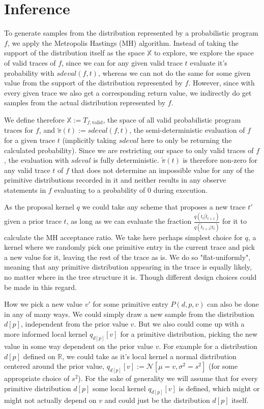 \section{Inference}

To generate samples from the distribution represented by a probabilistic program $f$, we apply the Metropolis Hastings (MH) algorithm. Instead of taking the support of the distribution itself as the space $\mathbb{X}$ to explore, we explore the space of valid traces of $f$, since we can for any given valid trace $t$ evaluate it's probability with $sdeval(f,t)$, whereas we can not do the same for some given value from the support of the distribution represented by $f$. However, since with every given trace we also get a corresponding return value, we indirectly do get samples from the actual distribution represented by $f$.

We define therefore $\mathbb{X} := T_{f,\text{valid}}$, the space of all valid probabilistic program traces for $f$, and $\tilde{\pi}(t) := sdeval(f,t)$, the semi-deterministic evaluation of $f$ for a given trace $t$ (implicitly taking $sdeval$ here to only be returning the calculated probability). Since we are restricting our space to only valid traces of $f$, the evaluation with $sdeval$ is fully deterministic. $\tilde{\pi}(t)$ is therefore non-zero for any valid trace $t$ of $f$ that does not determine an impossible value for any of the primitive distributions recorded in it and neither results in any observe statements in $f$ evaluating to a probability of $0$ during execution.

As the proposal kernel $q$ we could take any scheme that proposes a new trace $t'$ given a prior trace $t$, as long as we can evaluate the fraction $\frac{q(t_t | \hat{t}_{t+1})}{q(\hat{t}_{t+1} | t_t)}$ for it to calculate the MH acceptance ratio. We take here perhaps simplest choice for $q$, a kernel where we randomly pick one primitive entry in the current trace and pick a new value for it, leaving the rest of the trace as is. We do so "flat-uniformly", meaning that any primitive distribution appearing in the trace is equally likely, no matter where in the tree structure it is. Though different design choices could be made in this regard.

How we pick a new value $v'$ for some primitive entry $P(d,p,v)$ can also be done in any of many ways. We could simply draw a new sample from the distribution $d[p]$, independent from the prior value $v$. But we also could come up with a more informed local kernel $q_{d[p]}[v]$ for a primitive distribution, picking the new value in some way dependent on the prior value $v$. For example for a distribution $d[p]$ defined on $\mathbb{R}$, we could take as it's local kernel a normal distribution centered around the prior value, $q_{d[p]}[v] := \mathcal{N}[\mu = v, \sigma^2 = s^2]$ (for some appropriate choice of $s^2$). For the sake of generality we will assume that for every primitive distribution $d[p]$ some local kernel $q_{d[p]}[v]$ is defined, which might or might not actually depend on $v$ and could just be the distribution $d[p]$ itself.

